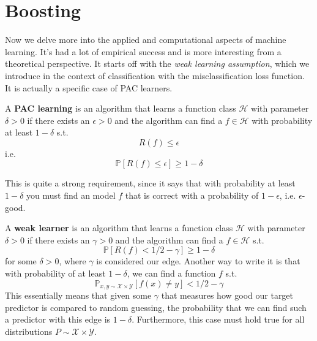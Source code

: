 \section{Boosting} 

  Now we delve more into the applied and computational aspects of machine learning. It's had a lot of empirical success and is more interesting from a theoretical perspective. It starts off with the \textit{weak learning assumption}, which we introduce in the context of classification with the misclassification loss function. It is actually a specific case of PAC learners. 

  \begin{definition}
    A \textbf{PAC learning} is an algorithm that learns a function class $\mathcal{H}$ with parameter $\delta > 0$ if there exists an $\epsilon > 0$ and the algorithm can find a $f \in \mathcal{H}$ with probability at least $1 - \delta$ s.t.
    \begin{equation}
      R(f) \leq \epsilon 
    \end{equation}
    i.e. 
    \begin{equation}
      \mathbb{P}[ R(f) \leq \epsilon] \geq 1 - \delta
    \end{equation}
  \end{definition}

  This is quite a strong requirement, since it says that with probability at least $1 - \delta$ you must find an model $f$ that is correct with a probability of $1 - \epsilon$, i.e. $\epsilon$-good.

  \begin{definition}
    A \textbf{weak learner} is an algorithm that learns a function class $\mathcal{H}$ with parameter $\delta > 0$ if there exists an $\gamma > 0$ and the algorithm can find a $f \in \mathcal{H}$ s.t. 
    \begin{equation}
      \mathbb{P}[ R(f) < 1/2 - \gamma] \geq 1 - \delta
    \end{equation}
    for some $\delta > 0$, where $\gamma$ is considered our edge. Another way to write it is that with probability of at least $1 - \delta$, we can find a function $f$ s.t. 
    \begin{equation}
      \mathbb{P}_{x, y \sim \mathcal{X} \times \mathcal{Y}} [f(x) \neq y] < 1/2 - \gamma 
    \end{equation}
    This essentially means that given some $\gamma$ that measures how good our target predictor is compared to random guessing, the probability that we can find such a predictor with this edge is $1 - \delta$. Furthermore, this case must hold true for all distributions $P \sim \mathcal{X} \times \mathcal{Y}$. 
  \end{definition}


